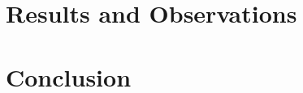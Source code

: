 \documentclass[12pt, a4paper]{report}
\newenvironment{code}
{\footnotesize\verbatim}{\endverbatim\normalfont}
\theoremstyle{definition}
\theoremstyle{definition}%
\theoremstyle{definition}%
\theoremstyle{definition}%
\theoremstyle{definition}%
\theoremstyle{definition}%
\begin{document}
\chapter{Results and Observations} \label{chap:results_observations}


\chapter{Conclusion} \label{chap:conclusion}


\appendix




\bibliomatter




\end{document}
